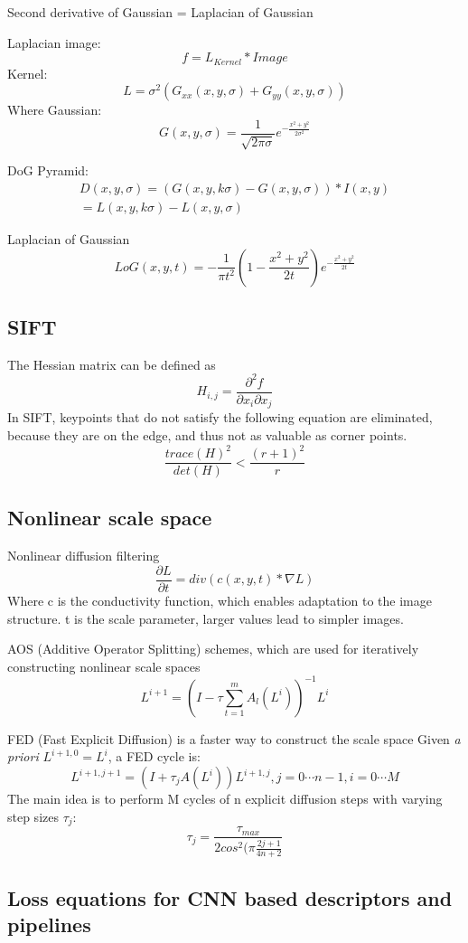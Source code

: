 Second derivative of Gaussian = Laplacian of Gaussian

Laplacian image:
\[
    f = L_{Kernel} * Image
\]
Kernel:
\[
    L = \sigma^2 (G_{xx}(x, y, \sigma) + G_{yy}(x,y,\sigma))
\]
Where Gaussian:
\[
    G(x,y,\sigma)=\frac{1}{\sqrt{2\pi\sigma}}e^{-\frac{x^2 + y^2}{2\sigma^2}}
\]

DoG Pyramid:
\[
    \begin{split}
    D(x,y,\sigma) =
    (G(x,y,k\sigma)-G(x,y,\sigma))*I(x,y) \\
    =L(x,y,k\sigma)-L(x,y,\sigma)
    \end{split}
\]

Laplacian of Gaussian
\[
    LoG(x,y,t)=-\frac{1}{\pi t^2}(1-\frac{x^2+y^2}{2t})e^{-\frac{x^2 + y^2}{2t}}
\]

\subsection{SIFT}
The Hessian matrix can be defined as 
\[
    H_{i,j} = \frac{\partial^2 f}{\partial x_i \partial x_j}
\]
In SIFT, keypoints that do not satisfy the following equation are eliminated,
because they are on the edge, and thus not as valuable as corner points.
\[
    \frac{trace(H)^2}{det(H)} < \frac{(r+1)^2}{r}
\]

\subsection{Nonlinear scale space}
Nonlinear diffusion filtering
\[
    \frac{\partial L}{\partial t} = div(c(x,y,t)*\nabla L)
\]
Where c is the conductivity function, which enables adaptation to the image
structure. t is the scale parameter, larger values lead to simpler images.

AOS (Additive Operator Splitting) schemes, which are used for iteratively
constructing nonlinear scale spaces
\[
    L^{i+1} = (I-\tau \sum_{t=1}^m A_l (L^i))^{-1} L^i
\]

FED (Fast Explicit Diffusion) is a faster way to construct the scale space
Given \textit{a priori} \(L^{i+1,0} = L^i\), a FED cycle is:
\[
    L^{i+1,j+1}=(I+\tau_j A(L^i))L^{i+1,j}, j=0\cdots n-1, i={0\cdots M}
\]
The main idea is to perform M cycles of n explicit diffusion steps with varying
step sizes \(\tau_j\):
\[
    \tau_j = \frac{\tau_{max}}{2cos^2(\pi\frac{2j+1}{4n+2}}
\]

\subsection{Loss equations for CNN based descriptors and pipelines}

